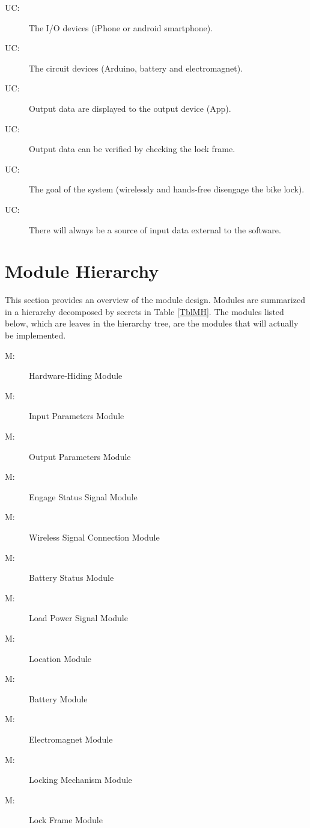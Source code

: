 \documentclass[12pt, titlepage]{article}
\newcounter{ucnum}
\newcommand{\uctheucnum}{UC\theucnum}
\newcounter{mnum}
\newcommand{\mthemnum}{M\themnum}
\begin{document}
\begin{description}

\item[\uctheucnum\label{ucIO}:] The I/O devices (iPhone or android smartphone). 
\item[\uctheucnum\label{ucCircuit}:] The circuit devices (Arduino, battery and electromagnet). 
\item[\uctheucnum\label{ucOutput}:] Output data are displayed to the output device (App). 
\item[\uctheucnum\label{ucVerify}:] Output data can be verified by checking the lock frame. 
\item[\uctheucnum\label{ucGoal}:] The goal of the system (wirelessly and hands-free disengage the bike lock). 
\item[\uctheucnum\label{ucInput}:] There will always be a source of input data external to the software.

\end{description}

\section{Module Hierarchy} \label{SecMH}

This section provides an overview of the module design. Modules are summarized
in a hierarchy decomposed by secrets in Table \ref{TblMH}. The modules listed
below, which are leaves in the hierarchy tree, are the modules that will
actually be implemented.

\begin{description}
\item [ \mthemnum \label{mHH}:] Hardware-Hiding Module
\item [ \mthemnum \label{mIP}:] Input Parameters Module 
\item [ \mthemnum \label{mOP}:] Output Parameters Module 
\item [ \mthemnum \label{mESS}:] Engage Status Signal Module 
\item [ \mthemnum \label{mWSC}:] Wireless Signal Connection Module 
\item [ \mthemnum \label{mBS}:] Battery Status Module 
\item [ \mthemnum \label{mLPS}:] Load Power Signal Module 
\item [ \mthemnum \label{mL}:] Location Module 
\item [ \mthemnum \label{mB}:] Battery Module 
\item [ \mthemnum \label{mEM}:] Electromagnet Module 
\item [ \mthemnum \label{mLM}:] Locking Mechanism Module 
\item [ \mthemnum \label{mLF}:] Lock Frame Module 

\end{description}
\end{document}
